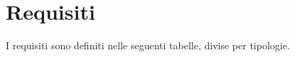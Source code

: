 \section{Requisiti}
I requisiti sono definiti nelle seguenti tabelle, divise per tipologie.
\begin{comment}
				\begin{itemize}
					\item \textbf{codice identificativo}: è un codice univoco e conforme alla codifica: \\ \\
					\centerline{\textbf{Re[Importanza][Tipologia][Codice]}} \\ \\
					Le voci riportate nella precedente codifica significano: 
					\begin{itemize}
						\item \textbf{Importanza}: la quale può assumere come valori:
						\begin{itemize}
							\item 1: requisito obbligatorio, irrinunciablie;
							\item 2: requisito desiderabile, perciò non obbligatorio ma riconosscibile;
							\item 3: requisito opzionale, ovvero trattabile in un secondo momento o relativamente utile.
						\end{itemize}
						\item \textbf{Tipologia}: la quale può assumere come valori:
						\begin{itemize}
							\item F: funzionale;
							\item P: prestazionale;
							\item Q: qualitativo;
							\item V: vincolo.
						\end{itemize}
						\item \textbf{Codice identificativo}: il quale è un identificatore univoco del requisito, e viene espresso in forma gerarchica padre/figlio.
					\end{itemize}
					\item \textbf{Classificazione}: specifica il peso del requisito facilitando la sua lettura anche se causa ridondanza;
					\item \textbf{Descrizione}: sintesi completa di un requisito;
					\item \textbf{Fonti}: il requisito può avere le seguenti provenienze:
					\begin{itemize}

\end{comment}
